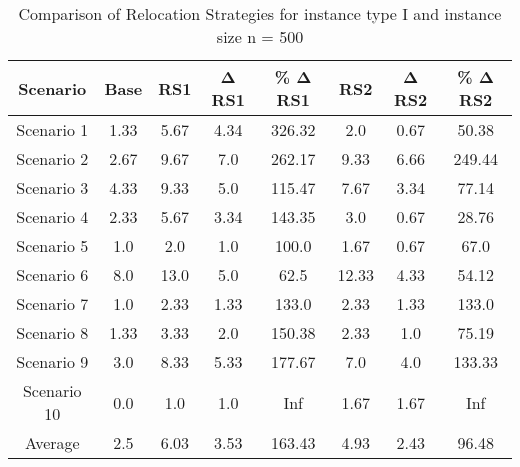 \begin{table}[H]
\centering
\begin{tabular}{cccccccc}
  \hline
  \textbf{Scenario} & \textbf{Base} & \textbf{RS1} & \textbf{Δ RS1} & \textbf{\% Δ RS1} & \textbf{RS2} & \textbf{Δ RS2} & \textbf{\% Δ RS2} \\\hline
  Scenario 1 & 1.33 & 5.67 & 4.34 & 326.32 & 2.0 & 0.67 & 50.38 \\
  Scenario 2 & 2.67 & 9.67 & 7.0 & 262.17 & 9.33 & 6.66 & 249.44 \\
  Scenario 3 & 4.33 & 9.33 & 5.0 & 115.47 & 7.67 & 3.34 & 77.14 \\
  Scenario 4 & 2.33 & 5.67 & 3.34 & 143.35 & 3.0 & 0.67 & 28.76 \\
  Scenario 5 & 1.0 & 2.0 & 1.0 & 100.0 & 1.67 & 0.67 & 67.0 \\
  Scenario 6 & 8.0 & 13.0 & 5.0 & 62.5 & 12.33 & 4.33 & 54.12 \\
  Scenario 7 & 1.0 & 2.33 & 1.33 & 133.0 & 2.33 & 1.33 & 133.0 \\
  Scenario 8 & 1.33 & 3.33 & 2.0 & 150.38 & 2.33 & 1.0 & 75.19 \\
  Scenario 9 & 3.0 & 8.33 & 5.33 & 177.67 & 7.0 & 4.0 & 133.33 \\
  Scenario 10 & 0.0 & 1.0 & 1.0 & Inf & 1.67 & 1.67 & Inf \\
  Average & 2.5 & 6.03 & 3.53 & 163.43 & 4.93 & 2.43 & 96.48 \\\hline
\end{tabular}
\caption{Comparison of Relocation Strategies for instance type I and instance size n = 500}
\label{tab:wait:resrelocation-comparison_I_500}
\end{table}
